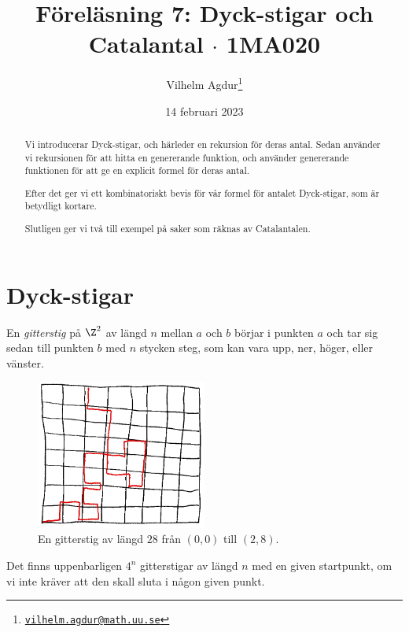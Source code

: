 \documentclass[nobib]{tufte-handout}
\title{Föreläsning 7: Dyck-stigar och Catalantal $\cdot$ 1MA020}
\author[Vilhelm Agdur]{Vilhelm Agdur\thanks{\href{mailto:vilhelm.agdur@math.uu.se}{\nolinkurl{vilhelm.agdur@math.uu.se}}}}
\date{14 februari 2023}
\begin{document}

\maketitle%

\begin{abstract}
\noindent
Vi introducerar Dyck-stigar, och härleder en rekursion för deras antal. Sedan använder vi rekursionen för att hitta en genererande funktion, och använder genererande funktionen för att ge en explicit formel för deras antal.

Efter det ger vi ett kombinatoriskt bevis för vår formel för antalet Dyck-stigar, som är betydligt kortare.

Slutligen ger vi två till exempel på saker som räknas av Catalantalen.
\end{abstract}

\section{Dyck-stigar}

\begin{definition}
    En \emph{gitterstig} på $\Z^2$ av längd $n$ mellan $a$ och $b$ börjar i punkten $a$ och tar sig sedan till punkten $b$ med $n$ stycken steg, som kan vara upp, ner, höger, eller vänster.
    \begin{figure}
        \centering
        \includegraphics[width=0.5\textwidth]{graphics/general_lattice_path.png}
        \caption{En gitterstig av längd $28$ från $(0,0)$ till $(2,8)$.}
    \end{figure} 
\end{definition}

Det finns uppenbarligen $4^n$ gitterstigar av längd $n$ med en given startpunkt, om vi inte kräver att den skall sluta i någon given punkt.
\end{document}
